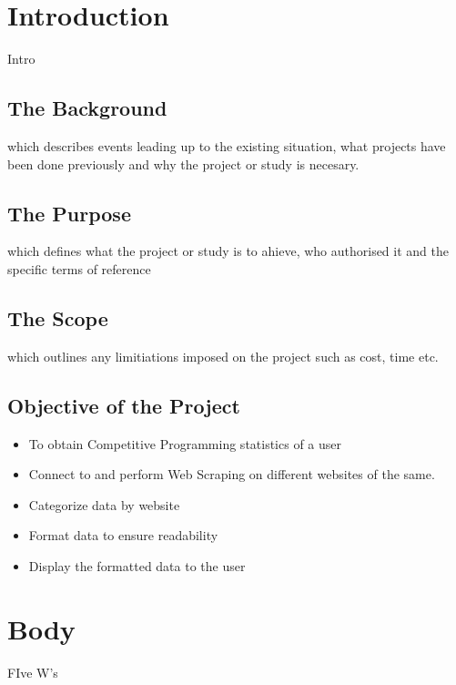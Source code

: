 \newpage

\tableofcontents


\newpage
\chapter{Introduction}

Intro

\section{The Background}
which describes events leading up to the existing situation, what projects have been done previously and why the project or study is necesary.

\section{The Purpose}
which defines what the project or study is to ahieve, who authorised it and the specific terms of reference

\section{The Scope}
which outlines any limitiations imposed on the project such as cost, time etc.

\section{Objective of the Project}
\begin{itemize}[itemsep=0em]
	\item To obtain Competitive Programming statistics of a user
	\item Connect to and perform Web Scraping on different websites of the same.
	\item Categorize data by website
	\item Format data to ensure readability
	\item Display the formatted data to the user
\end{itemize}

\newpage
\chapter{Body}

FIve W's


